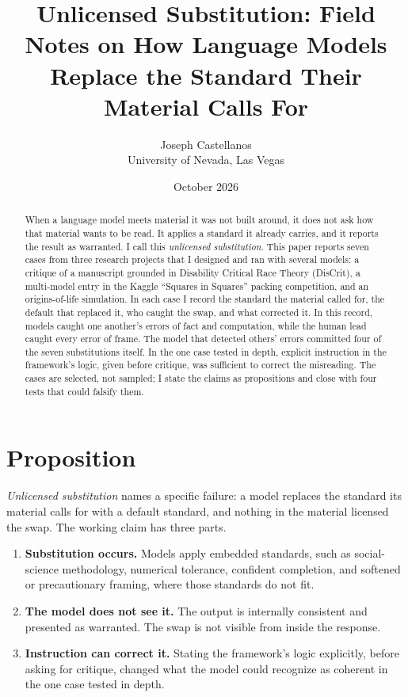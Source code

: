 \documentclass[11pt]{article}
\title{Unlicensed Substitution: Field Notes on How Language Models\\
Replace the Standard Their Material Calls For}
\author{Joseph Castellanos\\
\small University of Nevada, Las Vegas}
\date{October 2026}
\begin{document}
\maketitle

\begin{abstract}
When a language model meets material it was not built around, it does not
ask how that material wants to be read. It applies a standard it already
carries, and it reports the result as warranted. I call this
\emph{unlicensed substitution}. This paper reports seven cases from three
research projects that I designed and ran with several models: a critique
of a manuscript grounded in Disability Critical Race Theory (DisCrit), a
multi-model entry in the Kaggle ``Squares in Squares'' packing competition,
and an origins-of-life simulation. In each case I record the standard the
material called for, the default that replaced it, who caught the swap, and
what corrected it. In this record, models caught one another's errors of
fact and computation, while the human lead caught every error of frame. The
model that detected others' errors committed four of the seven
substitutions itself. In the one case tested in depth, explicit instruction
in the framework's logic, given before critique, was sufficient to correct
the misreading. The cases are selected, not sampled; I state the claims as
propositions and close with four tests that could falsify them.
\end{abstract}

\section{Proposition}

\emph{Unlicensed substitution} names a specific failure: a model replaces
the standard its material calls for with a default standard, and nothing in
the material licensed the swap. The working claim has three parts.

\begin{enumerate}
\item \textbf{Substitution occurs.} Models apply embedded standards, such as
social-science methodology, numerical tolerance, confident completion, and
softened or precautionary framing, where those standards do not fit.
\item \textbf{The model does not see it.} The output is internally consistent
and presented as warranted. The swap is not visible from inside the
response.
\item \textbf{Instruction can correct it.} Stating the framework's logic
explicitly, before asking for critique, changed what the model could
recognize as coherent in the one case tested in depth.
\end{enumerate}
\end{document}

